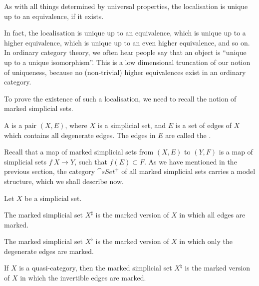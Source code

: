As with all things determined by universal properties,
the localisation is unique up to an equivalence, if it exists.

\begin{remark}
    In fact, the localisation is unique up to an equivalence,
    which is unique up to a higher equivalence,
    which is unique up to an even higher equivalence, and so on. 
    In ordinary category theory, we often hear people say that 
    an object is ``unique up to a unique isomorphism''.
    This is a low dimensional truncation of our notion of uniqueness,
    because no (non-trivial) higher equivalences exist in an ordinary category. \varqed
\end{remark}

To prove the existence of such a localisation,
we need to recall the notion of marked simplicial sets.

\begin{definition}
    A  is a pair $(X,E)$,
    where $X$ is a simplicial set,
    and $E$ is a set of edges of $X$ which contains all degenerate edges.
    The edges in $E$ are called the .
\end{definition}

Recall that a map of marked simplicial sets from $(X,E)$ to $(Y,F)$
is a map of simplicial sets $f\:X\to Y$, such that $f(E)\subset F$.
As we have mentioned in the previous section,
the category $\cat{sSet}^+$ of all marked simplicial sets 
carries a model structure, which we shall describe now.

\begin{definition}
    Let $X$ be a simplicial set.
    \begin{itms}
        \item The marked simplicial set $X^\sharp$
        is the marked version of $X$ in which all edges are marked.
        \item The marked simplicial set $X^\flat$
        is the marked version of $X$ in which only the degenerate edges are marked.
        \item If $X$ is a quasi-category, then the marked simplicial set $X^\natural$
        is the marked version of $X$ in which the invertible edges are marked.
    \end{itms}
\end{definition}

